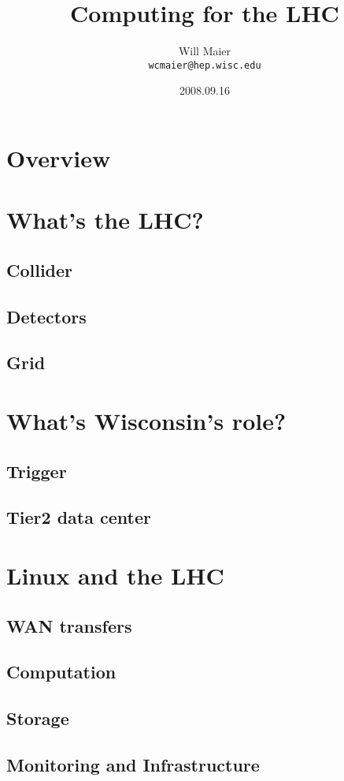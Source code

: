 \documentclass{beamer}
\title{Computing for the LHC}
\author[Maier]{
    Will Maier\\
    {\tt wcmaier@hep.wisc.edu}}\\
\institute[Wisconsin]{University of Wisconsin - High Energy Physics}
\date{2008.09.16}
\begin{document}
\begin{frame}
    \titlepage
\end{frame}

\section{Overview}
\begin{frame}
    \tableofcontents
\end{frame}

\section{What's the LHC?}
\subsection{Collider}
\subsection{Detectors}
\subsection{Grid}

\section{What's Wisconsin's role?}
\subsection{Trigger}
\subsection{Tier2 data center}

\section{Linux and the LHC}
\subsection{WAN transfers}
\subsection{Computation}
\subsection{Storage}
\subsection{Monitoring and Infrastructure}
\end{document}
